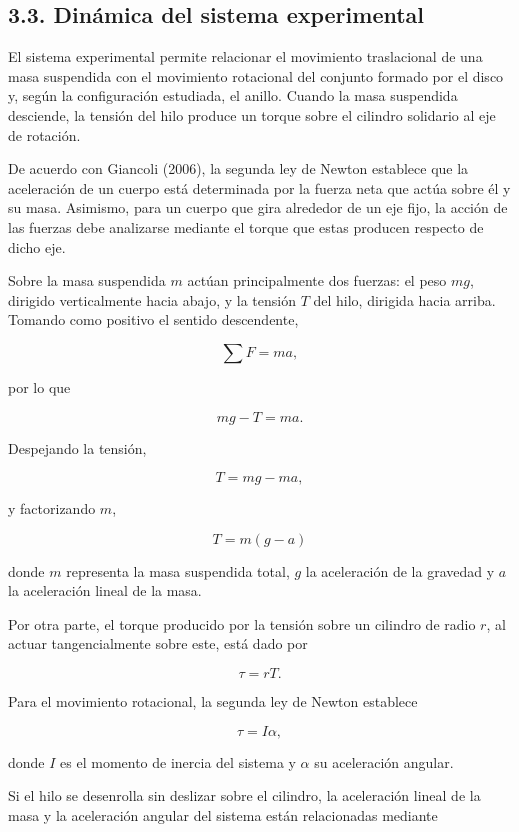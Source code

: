 \documentclass[11pt,a4paper]{article}
\begin{document}
\subsection*{3.3. Dinámica del sistema experimental}

El sistema experimental permite relacionar el movimiento traslacional de
una masa suspendida con el movimiento rotacional del conjunto formado por
el disco y, según la configuración estudiada, el anillo. Cuando la masa
suspendida desciende, la tensión del hilo produce un torque sobre el
cilindro solidario al eje de rotación.

De acuerdo con Giancoli (2006), la segunda ley de Newton establece que la
aceleración de un cuerpo está determinada por la fuerza neta que actúa sobre
él y su masa. Asimismo, para un cuerpo que gira alrededor de un eje fijo,
la acción de las fuerzas debe analizarse mediante el torque que estas
producen respecto de dicho eje.

Sobre la masa suspendida \(m\) actúan principalmente dos fuerzas: el peso
\(mg\), dirigido verticalmente hacia abajo, y la tensión \(T\) del hilo,
dirigida hacia arriba. Tomando como positivo el sentido descendente,

\[
\sum F=ma,
\]

por lo que

\[
mg-T=ma.
\]

Despejando la tensión,

\[
T=mg-ma,
\]

y factorizando \(m\),

\begin{equation}
T=m(g-a)
\label{eq:tension}
\end{equation}

donde \(m\) representa la masa suspendida total, \(g\) la aceleración de
la gravedad y \(a\) la aceleración lineal de la masa.

Por otra parte, el torque producido por la tensión sobre un cilindro de
radio \(r\), al actuar tangencialmente sobre este, está dado por

\[
\tau=rT.
\]

Para el movimiento rotacional, la segunda ley de Newton establece

\[
\tau=I\alpha,
\]

donde \(I\) es el momento de inercia del sistema y \(\alpha\) su
aceleración angular.

Si el hilo se desenrolla sin deslizar sobre el cilindro, la aceleración
lineal de la masa y la aceleración angular del sistema están relacionadas
mediante
\end{document}
